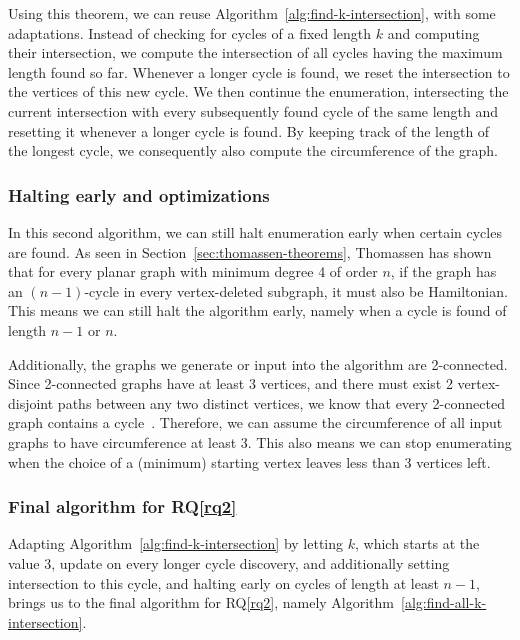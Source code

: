 Using this theorem, we can reuse Algorithm~\ref{alg:find-k-intersection}, with some adaptations. Instead of checking for cycles of a fixed length $k$ and computing their intersection, we compute the intersection of all cycles having the maximum length found so far. Whenever a longer cycle is found, we reset the intersection to the vertices of this new cycle. We then continue the enumeration, intersecting the current intersection with every subsequently found cycle of the same length and resetting it whenever a longer cycle is found. By keeping track of the length of the longest cycle, we consequently also compute the circumference of the graph.

\subsubsection{Halting early and optimizations}

In this second algorithm, we can still halt enumeration early when certain cycles are found. As seen in Section~\ref{sec:thomassen-theorems}, Thomassen has shown~\cite{article:thomassen} that for every planar graph with minimum degree 4 of order $n$, if the graph has an $(n-1)$-cycle in every vertex-deleted subgraph, it must also be Hamiltonian. This means we can still halt the algorithm early, namely when a cycle is found of length $n-1$ or $n$.

Additionally, the graphs we generate or input into the algorithm are 2-connected. Since 2-connected graphs have at least 3 vertices, and there must exist 2 vertex-disjoint paths between any two distinct vertices, we know that every 2-connected graph contains a cycle~\cite{book:bondy-definitions}. Therefore, we can assume the circumference of all input graphs to have circumference at least 3. This also means we can stop enumerating when the choice of a (minimum) starting vertex leaves less than 3 vertices left.

\subsubsection{Final algorithm for RQ\ref{rq2}}

Adapting Algorithm~\ref{alg:find-k-intersection} by letting $k$, which starts at the value $3$, update on every longer cycle discovery, and additionally setting intersection to this cycle, and halting early on cycles of length at least $n-1$, brings us to the final algorithm for RQ\ref{rq2}, namely Algorithm~\ref{alg:find-all-k-intersection}.

